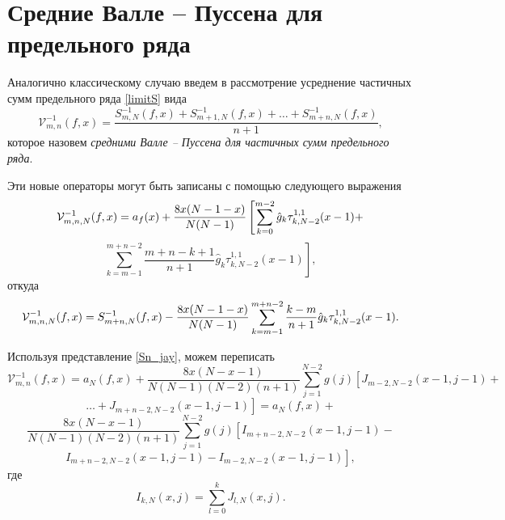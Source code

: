 


\section{Средние Валле -- Пуссена для предельного ряда}

Аналогично классическому случаю введем в рассмотрение усреднение частичных сумм предельного ряда \eqref{limitS} вида
\begin{equation}\label{limitVP}
  \mathcal{V}^{-1}_{m,n}(f,x) = \frac{S_{m,N}^{-1}(f,x) + S_{m+1,N}^{-1}(f,x) + \ldots + S_{m+n,N}^{-1}(f,x)}{n+1},
\end{equation}
которое назовем \textit{средними Валле -- Пуссена для частичных сумм предельного ряда}.


Эти новые операторы могут быть записаны с помощью следующего выражения
$$
\mathcal{V}_{m,n,N}^{-1}(f,x)=
a_f(x) + { 8x(N-1-x)\over N(N-1)}
\left[
\sum_{k=0}^{m-2}\hat g_k\tau_{k,N-2}^{1,1}(x-1) + \right.
$$
\begin{equation*}
\left.
\sum_{k=m-1}^{m+n-2} \frac{m+n-k+1}{n+1} \hat g_k \tau_{k,N-2}^{1,1}(x-1)
\right],
\end{equation*}
откуда
$$
\mathcal{V}_{m,n,N}^{-1}(f,x)=
S_{m+n,N}^{-1}(f,x) -
{ 8x(N-1-x)\over N(N-1)}
\sum_{k=m-1}^{m+n-2} \frac{k-m}{n+1} \hat g_k \tau_{k,N-2}^{1,1}(x-1).
$$


Используя представление \eqref{Sn_jay}, можем переписать
\begin{equation*}
  \mathcal{V}^{-1}_{m,n}(f,x) = a_N(f,x) + %
  \frac{8x(N-x-1)}{N(N-1)(N-2)(n+1)}
   \sum_{j=1}^{N-2} g(j) \left[ J_{m-2,N-2}(x-1,j-1) + \right.
\end{equation*}
\begin{equation*}
  \left.\ldots + J_{m+n-2,N-2}(x-1,j-1) \right] = a_N(f,x) +
\end{equation*}
\begin{equation*}
   \frac{8x(N-x-1)}{N(N-1)(N-2)(n+1)}
   \sum_{j=1}^{N-2} g(j) \left[ I_{m+n-2,N-2}(x-1,j-1) -  \right.
\end{equation*}
\begin{equation} \label{limVPf}
 \left. I_{m+n-2,N-2}(x-1,j-1) - I_{m-2,N-2}(x-1,j-1) \right],
\end{equation}
где
\begin{equation}\label{I}
  I_{k,N}(x,j) = \sum_{l=0}^{k} J_{l,N}(x,j).
\end{equation}

